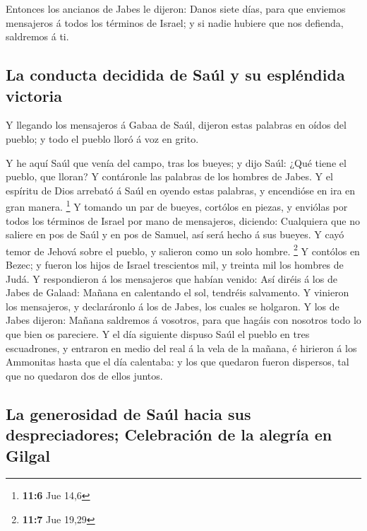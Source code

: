  Entonces los ancianos de Jabes le dijeron: Danos siete
días, para que enviemos mensajeros á todos los términos de Israel; y si
nadie hubiere que nos defienda, saldremos á ti.

\hypertarget{la-conducta-decidida-de-sauxfal-y-su-espluxe9ndida-victoria}{%
\subsection{La conducta decidida de Saúl y su espléndida
victoria}\label{la-conducta-decidida-de-sauxfal-y-su-espluxe9ndida-victoria}}

 Y llegando los mensajeros á Gabaa de Saúl, dijeron estas
palabras en oídos del pueblo; y todo el pueblo lloró á voz en grito.

 Y he aquí Saúl que venía del campo, tras los bueyes; y
dijo Saúl: ¿Qué tiene el pueblo, que lloran? Y contáronle las palabras
de los hombres de Jabes.  Y el espíritu de Dios arrebató á
Saúl en oyendo estas palabras, y encendióse en ira en gran manera.
\footnote{\textbf{11:6} Jue 14,6}  Y tomando un par de
bueyes, cortólos en piezas, y enviólas por todos los términos de Israel
por mano de mensajeros, diciendo: Cualquiera que no saliere en pos de
Saúl y en pos de Samuel, así será hecho á sus bueyes. Y cayó temor de
Jehová sobre el pueblo, y salieron como un solo hombre. \footnote{\textbf{11:7}
  Jue 19,29}  Y contólos en Bezec; y fueron los hijos de
Israel trescientos mil, y treinta mil los hombres de Judá.
 Y respondieron á los mensajeros que habían venido: Así
diréis á los de Jabes de Galaad: Mañana en calentando el sol, tendréis
salvamento. Y vinieron los mensajeros, y declaráronlo á los de Jabes,
los cuales se holgaron.  Y los de Jabes dijeron: Mañana
saldremos á vosotros, para que hagáis con nosotros todo lo que bien os
pareciere.  Y el día siguiente dispuso Saúl el pueblo en
tres escuadrones, y entraron en medio del real á la vela de la mañana, é
hirieron á los Ammonitas hasta que el día calentaba: y los que quedaron
fueron dispersos, tal que no quedaron dos de ellos juntos.

\hypertarget{la-generosidad-de-sauxfal-hacia-sus-despreciadores-celebraciuxf3n-de-la-alegruxeda-en-gilgal}{%
\subsection{La generosidad de Saúl hacia sus despreciadores; Celebración
de la alegría en
Gilgal}\label{la-generosidad-de-sauxfal-hacia-sus-despreciadores-celebraciuxf3n-de-la-alegruxeda-en-gilgal}}


